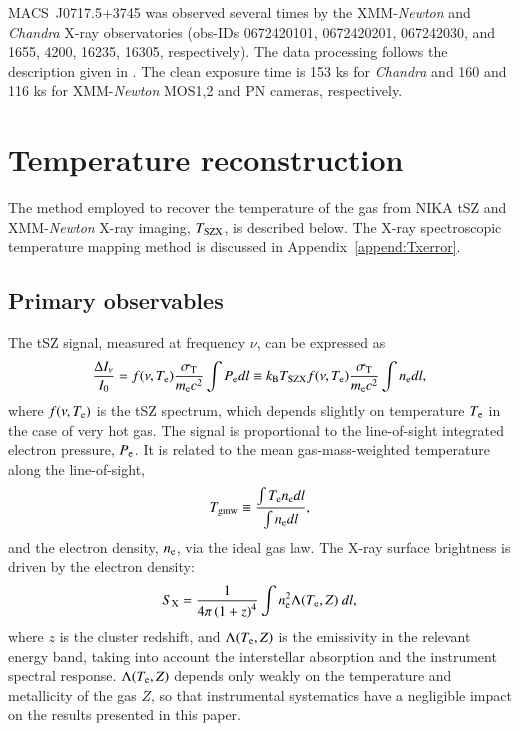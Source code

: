 \documentclass[twocolumn,traditabstract]{aa}
\newcommand{\ccor}[1]{\textcolor{Mypink}{#1}}
\def\TSZ {T_{\rm SZX}}
\def\TMW {T_{\rm gmw}}
\begin{document}
\mbox{MACS~J0717.5+3745} was observed several times by the XMM-\textit{Newton} and \textit{Chandra} X-ray observatories (obs-IDs 0672420101, 0672420201, 067242030, and \ccor{1655, 4200, 16235, 16305}, respectively). The data processing follows the description given in \cite{Adam2016b}. The clean exposure time is 153 ks for \textit{Chandra} and 160 and 116 ks for XMM-\textit{Newton} MOS1,2 and PN cameras, respectively.

\section{Temperature reconstruction}\label{sec:method}
\ccor{The method employed to recover the temperature of the gas from NIKA tSZ and XMM-\textit{Newton} X-ray imaging, $\TSZ$, is described below. The X-ray spectroscopic temperature mapping method is discussed in Appendix~\ref{append:Txerror}.}

\subsection{Primary observables}
The tSZ signal, measured at frequency $\nu$, can be expressed as
\begin{equation}
	\frac{\Delta I_{\nu}}{I_0} = f(\nu, T_{\rm e}) \frac{\sigma_{\rm T}}{m_{\rm e} c^2} \int P_{\rm e} dl \equiv k_{\rm B} \TSZ f(\nu, T_{\rm e}) \frac{\sigma_{\rm T}}{m_{\rm e} c^2} \int n_{\rm e} dl,
\label{eq:dIsz}
\end{equation}
where $f(\nu, T_{\rm e})$ is the tSZ spectrum, which depends slightly on temperature $T_{\rm e}$ in the case of very hot gas. The signal is proportional to the line-of-sight integrated electron pressure, $P_{\rm e}$. It is related to the mean gas-mass-weighted temperature along the line-of-sight, 
\begin{equation}
       \TMW  \equiv \frac{\int T_{\rm e} n_{\rm e} dl}{\int n_{\rm e} dl},
        \label{eq:Tgmw_def}
\end{equation}
and the electron density, $n_{\rm e}$, via the ideal gas law. The X-ray surface brightness is driven by the electron density:
\begin{equation}
        S_{\rm X}= \frac{1}{4 \pi \left(1+z\right)^4} \int n_{\rm e}^2 \Lambda(T_{\rm e}, Z) \ dl,
        \label{eq:sx}
\end{equation}
where  $z$ is the cluster redshift, and $\Lambda(T_{\rm e}, Z)$ is the emissivity in the relevant energy band, taking into account the interstellar absorption and the instrument spectral response. $\Lambda(T_{\rm e}, Z)$ depends only weakly on the temperature and metallicity of the gas $Z$, so that instrumental systematics have a negligible impact on the results presented in this paper.
\end{document}

